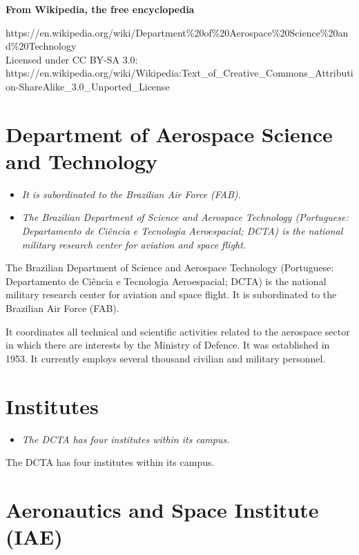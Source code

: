 \textbf{From Wikipedia, the free encyclopedia}

https://en.wikipedia.org/wiki/Department\%20of\%20Aerospace\%20Science\%20and\%20Technology\\
Licensed under CC BY-SA 3.0:\\
https://en.wikipedia.org/wiki/Wikipedia:Text\_of\_Creative\_Commons\_Attribution-ShareAlike\_3.0\_Unported\_License

\section{Department of Aerospace Science and
Technology}\label{department-of-aerospace-science-and-technology}

\begin{itemize}
\item
  \emph{It is subordinated to the Brazilian Air Force (FAB).}
\item
  \emph{The Brazilian Department of Science and Aerospace Technology
  (Portuguese: Departamento de Ciência e Tecnologia Aeroespacial; DCTA)
  is the national military research center for aviation and space
  flight.}
\end{itemize}

The Brazilian Department of Science and Aerospace Technology
(Portuguese: Departamento de Ciência e Tecnologia Aeroespacial; DCTA) is
the national military research center for aviation and space flight. It
is subordinated to the Brazilian Air Force (FAB).

It coordinates all technical and scientific activities related to the
aerospace sector in which there are interests by the Ministry of
Defence. It was established in 1953. It currently employs several
thousand civilian and military personnel.

\section{Institutes}\label{institutes}

\begin{itemize}
\item
  \emph{The DCTA has four institutes within its campus.}
\end{itemize}

The DCTA has four institutes within its campus.

\section{Aeronautics and Space Institute
(IAE)}\label{aeronautics-and-space-institute-iae}

